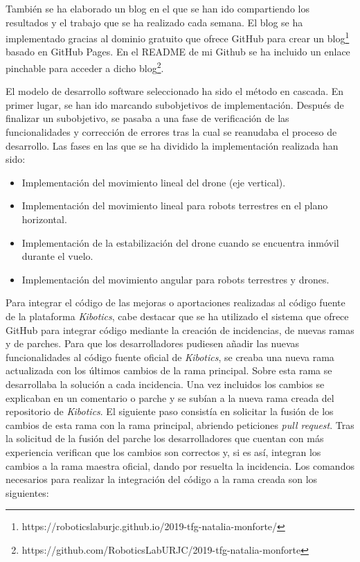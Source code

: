 También se ha elaborado un blog en el que se han ido compartiendo los resultados y el trabajo que se ha realizado cada semana. El blog se ha implementado gracias al dominio gratuito que ofrece GitHub para crear un blog\footnote{https://roboticslaburjc.github.io/2019-tfg-natalia-monforte/} basado en GitHub Pages. En el README de mi Github se ha incluido un enlace pinchable para acceder a dicho blog\footnote{https://github.com/RoboticsLabURJC/2019-tfg-natalia-monforte}. \newline

El modelo de desarrollo software seleccionado ha sido el método en cascada. En primer lugar, se han ido marcando subobjetivos de implementación. Después de finalizar un subobjetivo, se pasaba a una fase de verificación de las funcionalidades y corrección de errores tras la cual se reanudaba el proceso de desarrollo. Las fases en las que se ha dividido la implementación realizada han sido: 

\begin{itemize}
    \item Implementación del movimiento lineal del drone (eje vertical).
    \item Implementación del movimiento lineal para robots terrestres en el plano horizontal.
    \item Implementación de la estabilización del drone cuando se encuentra inmóvil durante el vuelo.
    \item Implementación del movimiento angular para robots terrestres y drones.
\end{itemize}

Para integrar el código de las mejoras o aportaciones realizadas al código fuente de la plataforma \textit{Kibotics}, cabe destacar que se ha utilizado el sistema que ofrece GitHub para integrar código mediante la creación de incidencias, de nuevas ramas y de parches. Para que los desarrolladores pudiesen añadir las nuevas funcionalidades al código fuente oficial de \textit{Kibotics}, se creaba una nueva rama actualizada con los últimos cambios de la rama
principal. Sobre esta rama se desarrollaba la solución a cada incidencia. Una vez incluidos los cambios se explicaban en un comentario o parche y se subían a la nueva rama creada del repositorio de \textit{Kibotics}. El siguiente paso consistía en solicitar la fusión de los cambios de esta rama con
la rama principal, abriendo peticiones \textit{pull request}. Tras la solicitud de la fusión del parche los desarrolladores que cuentan con más experiencia verifican que los cambios son correctos y, si es así, integran los cambios a la rama maestra oficial, dando por resuelta la incidencia. Los comandos necesarios para realizar la integración del código a la rama creada son los siguientes: 

